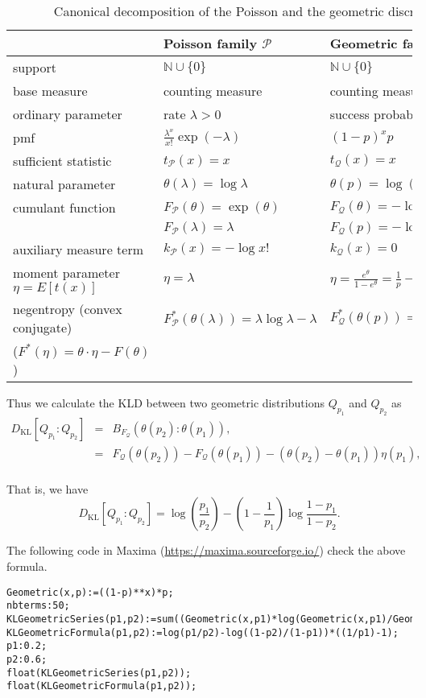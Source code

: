 \documentclass{article}
\def\bbN{\mathbb{N}}
\def\calP{\mathcal{P}}
\def\calQ{\mathcal{Q}}
\def\KL{\mathrm{KL}}
\begin{document}
\begin{table}
\centering
\begin{tabular}{lll}
 & Poisson family $\calP$ & Geometric family $\calQ$ \\ \hline
support & $\bbN \cup\{0\}$&   $\bbN \cup\{0\}$\\
base measure & counting measure  & counting measure\\
ordinary parameter & rate $\lambda>0$ & success probability $p\in (0,1)$ \\
pmf & $ \frac{\lambda^x}{x!} \exp(-\lambda)$  & $(1-p)^x p$\\
sufficient statistic & $t_\calP(x)=x$ & $t_\calQ(x)=x$\\
natural parameter & $\theta(\lambda)=\log\lambda$ & $\theta(p)=\log(1-p)$\\
cumulant function & $F_\calP(\theta)=\exp(\theta)$ & $F_\calQ(\theta)=-\log(1-\exp(\theta))$\\
                  & $F_\calP(\lambda)=\lambda$ & $F_\calQ(p)=-\log(p)$\\
auxiliary measure term & $k_\calP(x)=-\log x!$ & $k_\calQ(x)=0$\\
moment parameter $\eta=E[t(x)]$ & $\eta=\lambda$ & $\eta=\frac{e^\theta}{1-e^\theta}=\frac{1}{p}-1$\\
negentropy (convex conjugate) & $F^*_\calP(\theta(\lambda))=\lambda\log\lambda-\lambda$ & $F^*_\calQ(\theta(p))=(1-\frac{1}{p})\log(1-p)+\log p$\\
($F^*(\eta)=\theta\cdot\eta-F(\theta)$)
\end{tabular}
\caption{Canonical decomposition of the Poisson and the geometric discrete exponential families.}\label{tab:comparison}
\end{table}

Thus we calculate the KLD between two geometric distributions $Q_{p_1}$ and $Q_{p_2}$ as
\begin{eqnarray*}
D_\KL[Q_{p_1}:Q_{p_2}]&=&B_{F_\calQ}(\theta(p_2):\theta(p_1)),\\
&=& F_\calQ(\theta(p_2))-F_\calQ(\theta(p_1))-(\theta(p_2)-\theta(p_1))\eta(p_1),\\
\end{eqnarray*}

That is, we have
$$
\boxed{D_\KL[Q_{p_1}:Q_{p_2}]=\log\left(\frac{p_1}{p_2}\right)-\left(1-\frac{1}{p_1}\right)\log \frac{1-p_1}{1-p_2}}.
$$

The following code in {\sc Maxima} (\url{https://maxima.sourceforge.io/}) check the above formula.
{\footnotesize
\begin{verbatim}
Geometric(x,p):=((1-p)**x)*p;
nbterms:50;
KLGeometricSeries(p1,p2):=sum((Geometric(x,p1)*log(Geometric(x,p1)/Geometric(x,p2))),x,0,nbterms);
KLGeometricFormula(p1,p2):=log(p1/p2)-log((1-p2)/(1-p1))*((1/p1)-1);
p1:0.2;
p2:0.6;
float(KLGeometricSeries(p1,p2));
float(KLGeometricFormula(p1,p2));
\end{verbatim}
}
\end{document}
